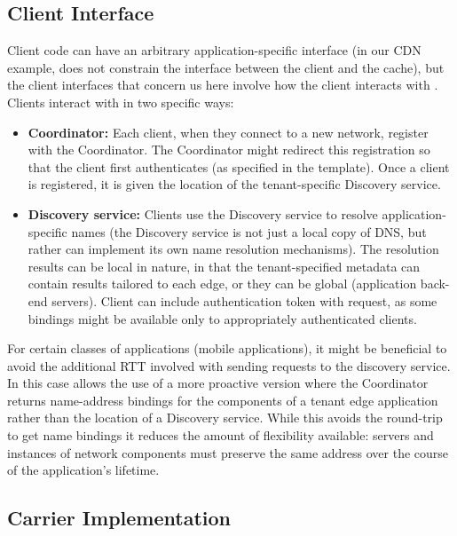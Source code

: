 \subsection{Client Interface}

Client code can have an arbitrary application-specific interface (\eg in our CDN example, \name does not constrain the interface between the client and the cache), but the client interfaces that concern us here involve how the client interacts with \name. Clients interact with \name in two specific ways:
\begin{itemize}
\item {\bf Coordinator:} Each client, when they connect to a new network, register with the Coordinator. The Coordinator might redirect this registration so that the client first authenticates (as specified in the template).  Once a client is registered, it is given the location of the tenant-specific Discovery service. 
\item {\bf Discovery service:} Clients use the Discovery service to resolve application-specific names (the Discovery service is not just a local copy of DNS, but rather can implement its own name resolution mechanisms). The resolution results can be local in nature, in that the tenant-specified metadata can contain results tailored to each edge, or they can be global (\eg application back-end servers). Client can include authentication token with request, as some bindings might be available only to appropriately authenticated clients. 
\end{itemize}

For certain classes of applications (\eg mobile applications), it might be beneficial to avoid the additional RTT involved with sending requests to the discovery service. In this case \name allows the use of a more proactive version where the Coordinator returns name-address bindings for the components of a tenant edge application rather than the location of a Discovery service.
While this avoids the round-trip to get name bindings it reduces the amount of flexibility available: servers and instances of network components must preserve the same address over the course of the application's lifetime.

\subsection{Carrier Implementation}

